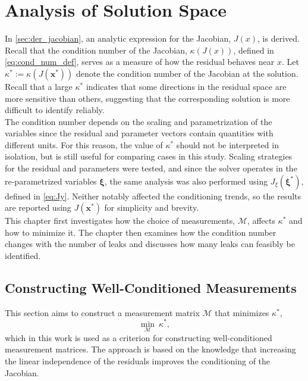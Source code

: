 \chapter{Analysis of Solution Space}
\label{chap:analysis_of_sol}

In \autoref{sec:der_jacobian}, an analytic expression for the Jacobian, $J(x)$, is derived. Recall that the condition number of the Jacobian, $\kappa(J(x))$, defined in \cref{eq:cond_num_def}, serves as a measure of how the residual behaves near $x$. Let $\kappa^*:=\kappa(J(\mathbf{x}^*))$ denote the condition number of the Jacobian at the solution. Recall that a large $\kappa^*$ indicates that some directions in the residual space are more sensitive than others, suggesting that the corresponding solution is more difficult to identify reliably.\\

The condition number depends on the scaling and parametrization of the variables since the residual and parameter vectors contain quantities with different units. For this reason, the value of $\kappa^*$ should not be interpreted in isolation, but is still useful for comparing cases in this study. Scaling strategies for the residual and parameters were tested, and since the solver operates in the re-parametrized variables $\bm{\xi}$, the same analysis was also performed using $J_\xi(\bm{\xi}^*)$, defined in \cref{eq:Jy}. Neither notably affected the conditioning trends, so the results are reported using $J(\mathbf{x}^*)$ for simplicity and brevity.\\

This chapter first investigates how the choice of measurements, $\mathcal{M}$, affects $\kappa^*$ and how to minimize it. The chapter then examines how the condition number changes with the number of leaks and discusses how many leaks can feasibly be identified.

\section{Constructing Well-Conditioned Measurements}

This section aims to construct a measurement matrix $\mathcal{M}$ that minimizes $\kappa^*$, 
\begin{equation*}
    \underset{\mathcal{M}}{\min} \ \kappa^*,
\end{equation*}
which in this work is used as a criterion for constructing well-conditioned measurement matrices. The approach is based on the knowledge that increasing the linear independence of the residuals improves the conditioning of the Jacobian.\\

